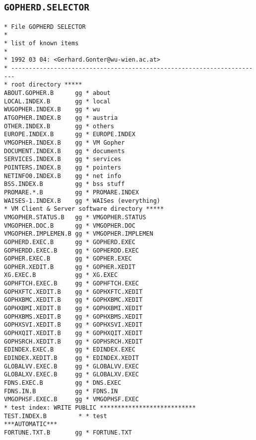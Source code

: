 \begin{appendix}
\subsection{\tt GOPHERD.SELECTOR}
\begin{small}
\begin{verbatim}
* File GOPHERD SELECTOR
*
* list of known items
*
* 1992 03 04: <Gerhard.Gonter@wu-wien.ac.at>
* -----------------------------------------------------------------------
* root directory *****
ABOUT.GOPHER.B      gg * about
LOCAL.INDEX.B       gg * local
WUGOPHER.INDEX.B    gg * wu
ATGOPHER.INDEX.B    gg * austria
OTHER.INDEX.B       gg * others
EUROPE.INDEX.B      gg * EUROPE.INDEX
VMGOPHER.INDEX.B    gg * VM Gopher
DOCUMENT.INDEX.B    gg * documents
SERVICES.INDEX.B    gg * services
POINTERS.INDEX.B    gg * pointers
NETINFO0.INDEX.B    gg * net info
BSS.INDEX.B         gg * bss stuff
PROMARE.*.B         gg * PROMARE.INDEX
WAISES-1.INDEX.B    gg * WAISes (everything)
* VM Client & Server software directory *****
VMGOPHER.STATUS.B   gg * VMGOPHER.STATUS
VMGOPHER.DOC.B      gg * VMGOPHER.DOC
VMGOPHER.IMPLEMEN.B gg * VMGOPHER.IMPLEMEN
GOPHERD.EXEC.B      gg * GOPHERD.EXEC
GOPHERDD.EXEC.B     gg * GOPHERDD.EXEC
GOPHER.EXEC.B       gg * GOPHER.EXEC
GOPHER.XEDIT.B      gg * GOPHER.XEDIT
XG.EXEC.B           gg * XG.EXEC
GOPHFTCH.EXEC.B     gg * GOPHFTCH.EXEC
GOPHXFTC.XEDIT.B    gg * GOPHXFTC.XEDIT
GOPHXBMC.XEDIT.B    gg * GOPHXBMC.XEDIT
GOPHXBMI.XEDIT.B    gg * GOPHXBMI.XEDIT
GOPHXBMS.XEDIT.B    gg * GOPHXBMS.XEDIT
GOPHXSVI.XEDIT.B    gg * GOPHXSVI.XEDIT
GOPHXQIT.XEDIT.B    gg * GOPHXQIT.XEDIT
GOPHSRCH.XEDIT.B    gg * GOPHSRCH.XEDIT
EDINDEX.EXEC.B      gg * EDINDEX.EXEC
EDINDEX.XEDIT.B     gg * EDINDEX.XEDIT
GLOBALVV.EXEC.B     gg * GLOBALVV.EXEC
GLOBALXV.EXEC.B     gg * GLOBALXV.EXEC
FDNS.EXEC.B         gg * DNS.EXEC
FDNS.IN.B           gg * FDNS.IN
VMGOPHSF.EXEC.B     gg * VMGOPHSF.EXEC
* test index: WRITE PUBLIC ***************************
TEST.INDEX.B         * * test
***AUTOMATIC***
FORTUNE.TXT.B       gg * FORTUNE.TXT
\end{verbatim}
\end{small}




\end{appendix}
